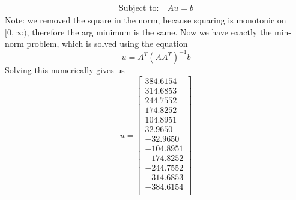 \documentclass{exam}
\begin{document}
\begin{solution}
\[\begin{aligned}
        \text{Subject to}: &\ Au = b 
      \end{aligned}
    \]
    Note: we removed the square in the norm, because squaring is monotonic on $[0, \infty)$, therefore the arg minimum is the same. Now we have exactly the min-norm problem, which is solved using the equation
    \[
      u = A^T(AA^T)^{-1}b
    \]
    Solving this numerically gives us
    \[
      u = 
      \begin{bmatrix}
        384.6154 \\
        314.6853 \\
        244.7552 \\
        174.8252 \\
        104.8951 \\
        32.9650 \\
        -32.9650 \\
        -104.8951 \\
        -174.8252 \\
        -244.7552 \\
        -314.6853 \\
        -384.6154 \\
      \end{bmatrix}
    \]
  \end{solution}
\end{document}
